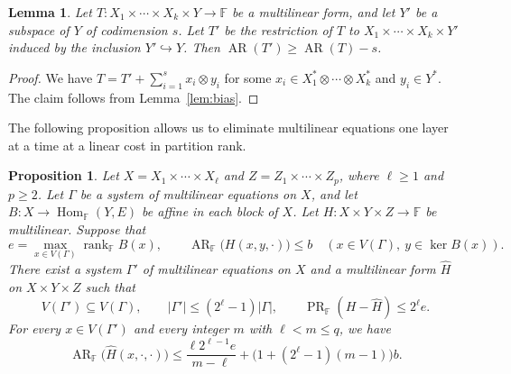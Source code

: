 \documentclass[11pt,reqno]{amsart}
\theoremstyle{plain}
\newtheorem{proposition}[theorem]{Proposition}
\newtheorem{lemma}[theorem]{Lemma}
\theoremstyle{definition}
\newcommand{\F}{\mathbb F}
\DeclareMathOperator{\Hom}{Hom}
\DeclareMathOperator{\arank}{AR}
\DeclareMathOperator{\prank}{PR}
\DeclareMathOperator{\rk}{rank}
\begin{document}
\begin{lemma}\label{lem:analytic quotient}
Let $T\colon X_1\times\cdots\times X_k\times Y\to\F$ be a multilinear form, and let $Y'$ be a subspace of $Y$ of codimension $s$. Let $T'$ be the restriction of $T$ to $X_1\times\cdots\times X_k\times Y'$ induced by the inclusion $Y'\hookrightarrow Y$. Then $\arank(T')\geq\arank(T)-s$.
\end{lemma}
\begin{proof}
We have $T=T'+\sum_{i=1}^s x_i\otimes y_i$ for some $x_i\in X_1^*\otimes\cdots\otimes X_k^*$ and $y_i\in Y^*$. The claim follows from Lemma~\ref{lem:bias}.
\end{proof}

The following proposition allows us to eliminate multilinear equations one layer at a time at a linear cost in partition rank.
\begin{proposition}\label{prop:kernel}
Let $X=X_1\times\cdots\times X_\ell$ and
$Z=Z_1\times\cdots\times Z_p$, where $\ell\geq1$ and $p\geq2$. Let $\Gamma$ be a system of multilinear equations on $X$, and let
$B\colon X\to\Hom_{\F}(Y,E)$ be affine in each block of $X$.
Let $H\colon X\times Y\times Z\to\F$ be multilinear. Suppose that
\[
 e=\max_{x\in V(\Gamma)}\rk_{\F}B(x),\qquad
 \arank_{\F}\bigl(H(x,y,\cdot)\bigr)\leq b
 \quad (x\in V(\Gamma),\ y\in\ker B(x)).
\]
There exist a system $\Gamma'$ of multilinear equations on $X$ and a multilinear form
$\widehat H$ on $X\times Y\times Z$ such that
\[
 V(\Gamma')\subseteq V(\Gamma),\qquad
 |\Gamma'|\leq(2^\ell-1)|\Gamma|,\qquad
 \prank_{\F}(H-\widehat H)\leq 2^\ell e.
\]
For every $x\in V(\Gamma')$ and every integer $m$ with $\ell<m\leq q$, we have
\begin{equation}\label{eq:kernel-tail}
 \arank_{\F}\bigl(\widehat H(x,\cdot,\cdot)\bigr)
 \leq \frac{\ell 2^{\ell-1}e}{m-\ell}
       +\bigl(1+(2^\ell-1)(m-1)\bigr)b .
\end{equation}
\end{proposition}
\end{document}
